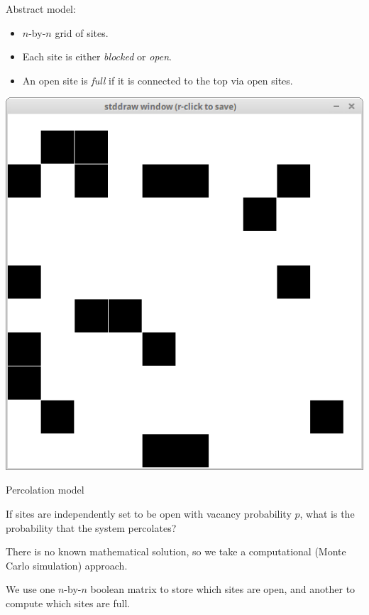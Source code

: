 \documentclass[8pt,a4paper,compress,handout]{beamer}
\begin{document}
\begin{frame}[fragile]
Abstract model:
\begin{itemize}
\item $n$-by-$n$ grid of sites.
\item Each site is either \emph{blocked} or \emph{open}.
\item An open site is \emph{full} if it is connected to the top via open sites.
\end{itemize}

\begin{center}
\includegraphics[scale=0.4]{figures/percolation1.png}

\smallskip

\tiny Percolation model
\end{center}

\bigskip

If sites are independently set to be open with vacancy probability $p$, what is the probability that the system percolates?

\bigskip

There is no known mathematical solution, so we take a computational (Monte Carlo simulation) approach.

\bigskip

We use one $n$-by-$n$ boolean matrix to store which sites are open, and another to compute which sites are full. 
\end{frame}
\end{document}
